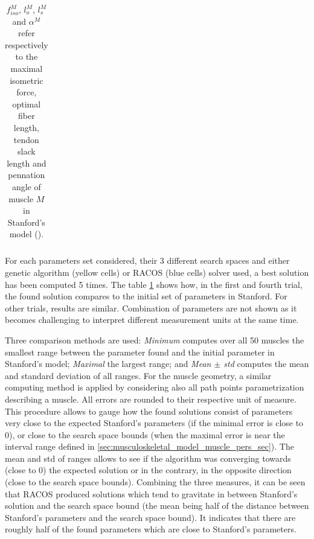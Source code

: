 \begin{table}[!ht]
\begin{tabular}{|c|c|c|c|c|c|c|}
    \end{tabular}
    \caption{$f_{iso}^M$, $l_o^M$, $l_s^M$ and $\alpha^M$ refer respectively to the maximal isometric force, optimal fiber length, tendon slack length and pennation angle of muscle $M$ in Stanford's model (\cite{holzbaurModelUpperExtremity2005}).}
    \label{tab:accuracy_fitting_polytosfsffpe_p6}
\end{table}
\egroup


For each parameters set considered, their 3 different search spaces and either genetic algorithm (yellow cells) or RACOS (blue cells) solver used, a best solution has been computed 5 times. The table \ref{tab:accuracy_fitting_polytosfsffpe_p6} shows how, in the first and fourth trial, the found solution compares to the initial set of parameters in Stanford. For other trials, results are similar. Combination of parameters are not shown as it becomes challenging to interpret different measurement units at the same time. 

Three comparison methods are used: \emph{Minimum} computes over all 50 muscles the smallest range between the parameter found and the initial parameter in Stanford's model; \emph{Maximal} the largest range; and \emph{Mean $\pm$ std} computes the mean and standard deviation of all ranges. For the muscle geometry, a similar computing method is applied by considering also all path points parametrization describing a muscle. All errors are rounded to their respective unit of measure. This procedure allows to gauge how the found solutions consist of parameters very close to the expected Stanford's parameters (if the minimal error is close to 0), or close to the search space bounds (when the maximal error is near the interval range defined in \ref{sec:musculoskeletal_model_muscle_pers_sec}). The mean and std of ranges allows to see if the algorithm was converging towards (close to 0) the expected solution or in the contrary, in the opposite direction (close to the search space bounds). Combining the three measures, it can be seen that RACOS produced solutions which tend to gravitate in between Stanford's solution and the search space bound (the mean being half of the distance between Stanford's parameters and the search space bound). It indicates that there are roughly half of the found parameters which are close to Stanford's parameters. 

